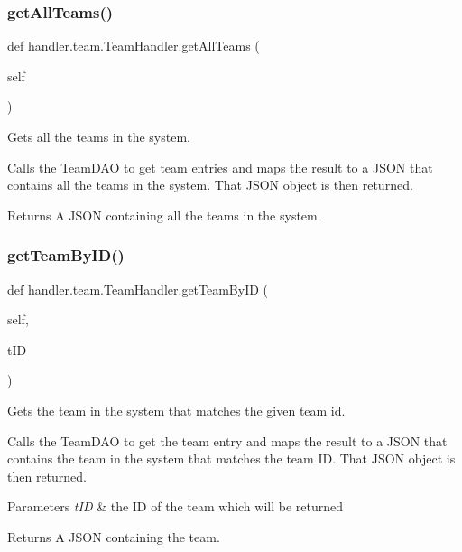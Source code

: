 \subsubsection{\texorpdfstring{get\+All\+Teams()}{getAllTeams()}}
{\footnotesize\ttfamily def handler.\+team.\+Team\+Handler.\+get\+All\+Teams (\begin{DoxyParamCaption}\item[{}]{self }\end{DoxyParamCaption})}



Gets all the teams in the system. 

Calls the Team\+D\+AO to get team entries and maps the result to a J\+S\+ON that contains all the teams in the system. That J\+S\+ON object is then returned.

\begin{DoxyReturn}{Returns}
A J\+S\+ON containing all the teams in the system. 
\end{DoxyReturn}
\mbox{\label{classhandler_1_1team_1_1_team_handler_ad8844435c8d6951748a7dc17702a2a19}} 
\subsubsection{\texorpdfstring{get\+Team\+By\+I\+D()}{getTeamByID()}}
{\footnotesize\ttfamily def handler.\+team.\+Team\+Handler.\+get\+Team\+By\+ID (\begin{DoxyParamCaption}\item[{}]{self,  }\item[{}]{t\+ID }\end{DoxyParamCaption})}



Gets the team in the system that matches the given team id. 

Calls the Team\+D\+AO to get the team entry and maps the result to a J\+S\+ON that contains the team in the system that matches the team ID. That J\+S\+ON object is then returned.


\begin{DoxyParams}{Parameters}
{\em t\+ID} & the ID of the team which will be returned\\
\hline
\end{DoxyParams}
\begin{DoxyReturn}{Returns}
A J\+S\+ON containing the team. 
\end{DoxyReturn}
\mbox{\label{classhandler_1_1team_1_1_team_handler_a4ee11f08a2e69e4a250527c9fea26190}} 
